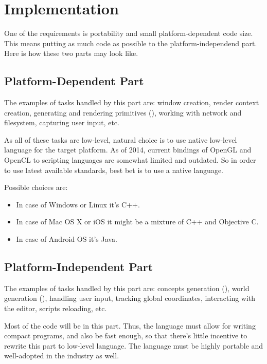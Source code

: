 \documentclass[12pt]{article}
\begin{document}
\section{Implementation}

One of the requirements is portability and small platform-dependent code size.
This means putting as much code as possible to the platform-independend part.
Here is how these two parts may look like.

\subsection{Platform-Dependent Part}

The examples of tasks handled by this part are:
window creation, render context creation, generating and rendering primitives
(), working with network and filesystem, capturing
user input, etc.

As all of these tasks are low-level, natural choice is to use native low-level
language for the target platform.
As of 2014, current bindings of OpenGL and OpenCL to scripting languages are
somewhat limited and outdated.
So in order to use latest available standards, best bet is to use a native
language.

Possible choices are:

\begin{itemize}
    \item In case of Windows or Linux it's C++.
    \item In case of Mac OS X or iOS it might be a mixture of C++ and
        Objective C.
    \item In case of Android OS it's Java.
\end{itemize}

\subsection{Platform-Independent Part}

The examples of tasks handled by this part are:
concepts generation (),
world generation (),
handling user input, tracking global coordinates,
interacting with the editor, scripts reloading, etc.

Most of the code will be in this part.
Thus, the language must allow for writing compact programs, and also
be fast enough, so that there's little incentive to rewrite this part to
low-level language.
The language must be highly portable and well-adopted in the industry as well.
\end{document}

